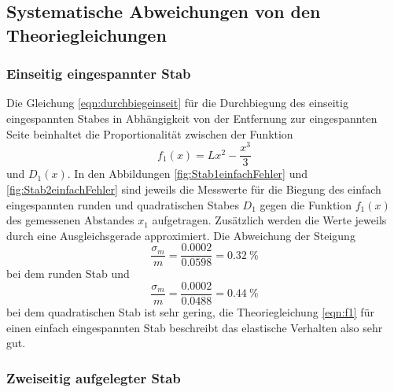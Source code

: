 \subsection{Systematische Abweichungen von den Theoriegleichungen}

\subsubsection{Einseitig eingespannter Stab}

Die Gleichung \eqref{eqn:durchbiegeinseit} für die Durchbiegung des einseitig
eingespannten Stabes in Abhängigkeit von der Entfernung zur eingespannten
Seite beinhaltet die Proportionalität zwischen der Funktion
\begin{equation}
  f_1(x) = Lx^2 - \frac{x^3}{3}
  \label{eqn:f1}
\end{equation}
und $D_1(x)$. In den Abbildungen \ref{fig:Stab1einfachFehler} und
\ref{fig:Stab2einfachFehler} sind jeweils die
Messwerte für die Biegung des einfach eingespannten runden und quadratischen
Stabes $D_1$ gegen die Funktion $f_1(x)$ des gemessenen Abstandes $x_1$
aufgetragen. Zusätzlich werden die Werte jeweils durch eine Ausgleichsgerade
approximiert. Die Abweichung der Steigung
\begin{equation}
  \frac{\sigma_m}{m} = \frac{0.0002}{0.0598} = \SI{0.32}{\percent}
\end{equation}
bei dem runden Stab und
\begin{equation}
  \frac{\sigma_m}{m}=\frac{0.0002}{0.0488} = \SI{0.44}{\percent}
\end{equation}
bei dem quadratischen Stab ist sehr gering, die Theoriegleichung \eqref{eqn:f1}
für einen einfach eingespannten Stab beschreibt das elastische Verhalten
also sehr gut.

\subsubsection{Zweiseitig aufgelegter Stab}
\label{sec:SysAbwDoppAuf}

